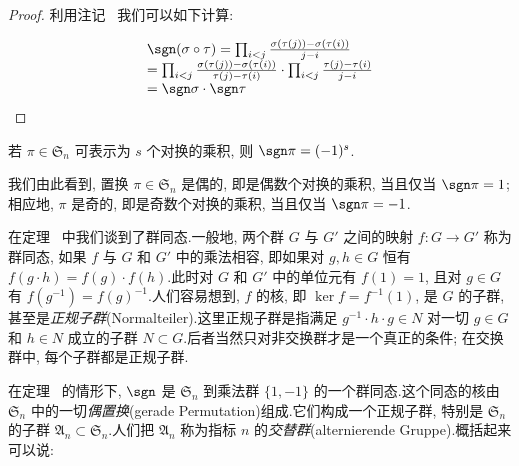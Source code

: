 \begin{proof}
利用注记~ 我们可以如下计算:

\[
\begin{array}{l}
\sgn(\sigma \circ \tau) = \prod_{i < j} \frac{\sigma(\tau(j)) - \sigma(\tau(i))}{j - i} \\
= \prod_{i < j} \frac{\sigma(\tau(j)) - \sigma(\tau(i))}{\tau(j) - \tau(i)} \cdot \prod_{i < j} \frac{\tau(j) - \tau(i)}{j - i} \\
= \sgn \sigma \cdot \sgn \tau
\end{array}
\]
\end{proof}

\begin{corollary}\label{cor:4.1.8}
若 $\pi \in \mathfrak{S}_n$ 可表示为 $s$ 个对换的乘积, 则 $\sgn \pi = (-1)^s$.
\end{corollary}

我们由此看到, 置换 $\pi \in \mathfrak{S}_n$ 是偶的, 即是偶数个对换的乘积, 当且仅当 $\sgn \pi = 1$; 相应地, $\pi$ 是奇的, 即是奇数个对换的乘积, 当且仅当 $\sgn \pi = -1$.

在定理~ 中我们谈到了群同态.一般地, 两个群 $G$ 与 $G'$ 之间的映射 $f \colon G \longrightarrow G'$ 称为群同态, 如果 $f$ 与 $G$ 和 $G'$ 中的乘法相容, 即如果对 $g, h \in G$ 恒有 $f(g \cdot h) = f(g) \cdot f(h)$.此时对 $G$ 和 $G'$ 中的单位元有 $f(1) = 1$, 且对 $g \in G$ 有 $f(g^{-1}) = f(g)^{-1}$.人们容易想到, $f$ 的核, 即 $\ker f = f^{-1}(1)$, 是 $G$ 的子群, 甚至是\emph{正规子群}(\textup{Normalteiler}).这里正规子群是指满足 $g^{-1} \cdot h \cdot g \in N$ 对一切 $g \in G$ 和 $h \in N$ 成立的子群 $N \subset G$.后者当然只对非交换群才是一个真正的条件; 在交换群中, 每个子群都是正规子群.

在定理~ 的情形下, $\sgn$ 是 $\mathfrak{S}_n$ 到乘法群 $\{1, -1\}$ 的一个群同态.这个同态的核由 $\mathfrak{S}_n$ 中的一切\emph{偶置换}(\textup{gerade Permutation})组成.它们构成一个正规子群, 特别是 $\mathfrak{S}_n$ 的子群 $\mathfrak{A}_n \subset \mathfrak{S}_n$.人们把 $\mathfrak{A}_n$ 称为指标 $n$ 的\emph{交替群}(\textup{alternierende Gruppe}).概括起来可以说:

